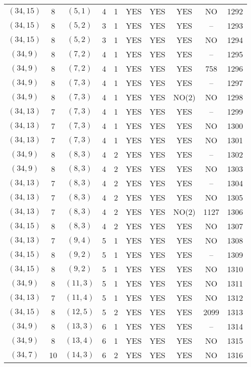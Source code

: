 \begin{longtable}{|c|c|c|c|c|c|c|c|c|c|}
$(34, 15)$ & 8 & $(5, 1)$ & 4 & 1 & YES & YES & YES & NO & 1292\\
$(34, 15)$ & 8 & $(5, 2)$ & 3 & 1 & YES & YES & YES & -- & 1293\\
$(34, 15)$ & 8 & $(5, 2)$ & 3 & 1 & YES & YES & YES & NO & 1294\\
$(34, 9)$ & 8 & $(7, 2)$ & 4 & 1 & YES & YES & YES & -- & 1295\\
$(34, 9)$ & 8 & $(7, 2)$ & 4 & 1 & YES & YES & YES & 758 & 1296\\
$(34, 9)$ & 8 & $(7, 3)$ & 4 & 1 & YES & YES & YES & -- & 1297\\
$(34, 9)$ & 8 & $(7, 3)$ & 4 & 1 & YES & YES & NO(2) & NO & 1298\\
$(34, 13)$ & 7 & $(7, 3)$ & 4 & 1 & YES & YES & YES & -- & 1299\\
$(34, 13)$ & 7 & $(7, 3)$ & 4 & 1 & YES & YES & YES & NO & 1300\\
$(34, 13)$ & 7 & $(7, 3)$ & 4 & 1 & YES & YES & YES & NO & 1301\\
$(34, 9)$ & 8 & $(8, 3)$ & 4 & 2 & YES & YES & YES & -- & 1302\\
$(34, 9)$ & 8 & $(8, 3)$ & 4 & 2 & YES & YES & YES & NO & 1303\\
$(34, 13)$ & 7 & $(8, 3)$ & 4 & 2 & YES & YES & YES & -- & 1304\\
$(34, 13)$ & 7 & $(8, 3)$ & 4 & 2 & YES & YES & YES & NO & 1305\\
$(34, 13)$ & 7 & $(8, 3)$ & 4 & 2 & YES & YES & NO(2) & 1127 & 1306\\
$(34, 15)$ & 8 & $(8, 3)$ & 4 & 2 & YES & YES & YES & NO & 1307\\
$(34, 13)$ & 7 & $(9, 4)$ & 5 & 1 & YES & YES & YES & NO & 1308\\
$(34, 15)$ & 8 & $(9, 2)$ & 5 & 1 & YES & YES & YES & -- & 1309\\
$(34, 15)$ & 8 & $(9, 2)$ & 5 & 1 & YES & YES & YES & NO & 1310\\
$(34, 9)$ & 8 & $(11, 3)$ & 5 & 1 & YES & YES & YES & NO & 1311\\
$(34, 13)$ & 7 & $(11, 4)$ & 5 & 1 & YES & YES & YES & NO & 1312\\
$(34, 15)$ & 8 & $(12, 5)$ & 5 & 2 & YES & YES & YES & 2099 & 1313\\
$(34, 9)$ & 8 & $(13, 3)$ & 6 & 1 & YES & YES & YES & -- & 1314\\
$(34, 9)$ & 8 & $(13, 4)$ & 6 & 1 & YES & YES & YES & NO & 1315\\
$(34, 7)$ & 10 & $(14, 3)$ & 6 & 2 & YES & YES & YES & NO & 1316\\

\end{longtable}
